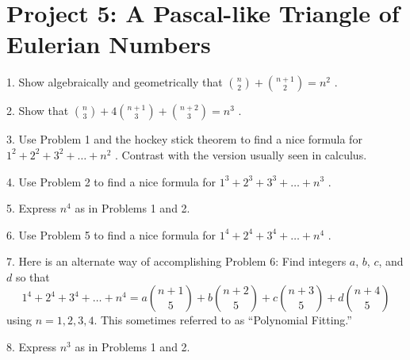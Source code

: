 \documentclass[10pt,]{book}
\theoremstyle{plain}
\theoremstyle{definition}
\theoremstyle{definition}
\theoremstyle{definition}
\numberwithin{equation}{chapter}
\begin{document}
\section[{Project 5: A Pascal-like Triangle of Eulerian Numbers}]{Project 5: A Pascal-like Triangle of Eulerian Numbers}\label{exercises-5}
\begin{exerciselist}
\item[1.]\hypertarget{exercise-35}{}\hypertarget{p-1713}{}%
Show algebraically and geometrically that \(\binom{n}{2}
+
\binom{n + 1}{2}
= n^{2}\) .%
\par\smallskip
\item[2.]\hypertarget{exercise-36}{}\hypertarget{p-1714}{}%
Show that \(\binom{n}{3}
+ 4
\binom{n + 1}{3}
+
\binom{n + 2}{3}
= n^{3}\) .%
\par\smallskip
\item[3.]\hypertarget{exercise-37}{}\hypertarget{p-1715}{}%
Use Problem 1 and the hockey stick theorem to find a nice formula for \(1^{2} + 2^{2} + 3^{2} + \ldots + n^{2}\) . Contrast with the version usually seen in calculus.%
\par\smallskip
\item[4.]\hypertarget{exercise-38}{}\hypertarget{p-1716}{}%
Use Problem 2 to find a nice formula for \(1^{3} + 2^{3} + 3^{3} + \ldots + n^{3}\) .%
\par\smallskip
\item[5.]\hypertarget{exercise-39}{}\hypertarget{p-1717}{}%
Express \(n^{4}\) as in Problems 1 and 2.%
\par\smallskip
\item[6.]\hypertarget{exercise-40}{}\hypertarget{p-1718}{}%
Use Problem 5 to find a nice formula for \(1^{4} + 2^{4} + 3^{4} + \ldots + n^{4}\) .%
\par\smallskip
\item[7.]\hypertarget{exercise-41}{}\hypertarget{p-1719}{}%
Here is an alternate way of accomplishing Problem 6:  Find integers \(a\), \(b\), \(c\), and \(d\) so that%
\begin{equation*}
1^{4} + 2^{4} + 3^{4} + \ldots + n^{4} = a\binom{n + 1}{5}  + b\binom{n + 2}{5}  + c\binom{n + 3}{5}  + d\binom{n + 4}{5}
\end{equation*}
using \(n=1, 2, 3, 4\). This sometimes referred to as ``Polynomial Fitting.''%
\par\smallskip
\item[8.]\hypertarget{exercise-42}{}\hypertarget{p-1720}{}%
Express \(n^{3}\) as in Problems 1 and 2.%
\par\smallskip

\end{exerciselist}
\end{document}
